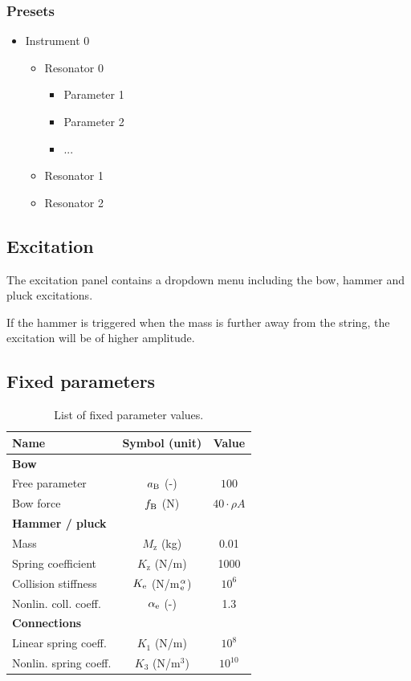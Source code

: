 \documentclass{article}
\begin{document}
\subsubsection{Presets}\label{sec:presets}
\begin{itemize}
    \item Instrument 0
    \begin{itemize}
        \item Resonator 0
        \begin{itemize}
            \itemsep0em 
            \item Parameter 1
            \item Parameter 2
            \item ...
        \end{itemize}
        \item Resonator 1
        \item Resonator 2
    \end{itemize}
\end{itemize}

\subsection{Excitation}
The excitation panel contains a dropdown menu including the bow, hammer and pluck excitations.

If the hammer is triggered when the mass is further away from the string, the excitation will be of higher amplitude.

\subsection{Fixed parameters}
\begin{table}[h]\label{tab:parameters}
\begin{center}
\begin{tabular}{|l|c|c|}
    \hline
    Name & Symbol (unit) & Value\\ \hline
    \multicolumn{3}{|l|}{\bf Bow}\\ \hline
    Free parameter & $a_{\text{B}}$ (-) & $100$\\
    Bow force & $f_{\text{B}}$ (N) & $40 \cdot \rho A$\\\hline
    \multicolumn{3}{|l|}{\bf Hammer / pluck}\\ \hline
    Mass & $M_\text{z}$ (kg) & 0.01\\
    Spring coefficient & $K_\text{z}$ (N/m) & 1000\\
    Collision stiffness& $K_{\text{e}}$ (N/m$^\alpha_{\text{e}}$) & $10^6$\\
    Nonlin. coll. coeff. & $\alpha_{\text{e}}$ (-) & 1.3\\\hline
    \multicolumn{3}{|l|}{\bf Connections}\\ \hline
    Linear spring coeff. & $K_1$ (N/m)  & $10^8$ \\
    Nonlin. spring coeff. & $K_3$ (N/m$^3$)  & $10^{10}$
    \\\hline
\end{tabular}
\caption{List of fixed parameter values.}
\end{center}
\end{table}
\end{document}
